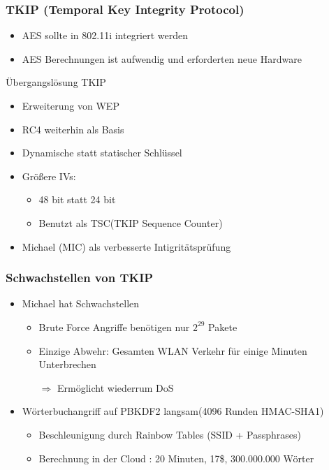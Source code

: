 \documentclass{beamer}
\begin{document}
\begin{frame}
\frametitle{TKIP (Temporal Key Integrity Protocol)}
\begin{itemize}
	\item AES sollte in 802.11i integriert werden
	\item AES Berechnungen ist aufwendig und erforderten neue Hardware
\end{itemize}
\begin{block}{Übergangslösung TKIP}
	\begin{itemize}
		\item Erweiterung von WEP
		\item RC4 weiterhin als Basis
		\item Dynamische statt statischer Schlüssel
		\item Größere IVs:
		\begin{itemize}
			\item 48 bit statt 24 bit
			\item Benutzt als TSC(TKIP Sequence Counter)
		\end{itemize}
		\item Michael (MIC) als verbesserte Intigritätsprüfung
	\end{itemize}
\end{block}
\end{frame}

\begin{frame}
\frametitle{Schwachstellen von TKIP}
\begin{itemize}
	\item Michael hat Schwachstellen
	\begin{itemize}
		\item Brute Force Angriffe benötigen nur $2^{29}$ Pakete
		\item Einzige Abwehr: Gesamten WLAN Verkehr für einige Minuten Unterbrechen
		\item[$\Rightarrow$] Ermöglicht wiederrum DoS
	\end{itemize}
	\item Wörterbuchangriff auf PBKDF2 langsam(4096 Runden HMAC-SHA1)
	\begin{itemize}
		\item Beschleunigung durch Rainbow Tables \cite{renderlab} (SSID + Passphrases)
		\item Berechnung in der Cloud \cite{cloudcracker}: 20 Minuten, 17\$, 300.000.000 Wörter
	\end{itemize}
\end{itemize}
\end{frame}
\end{document}
